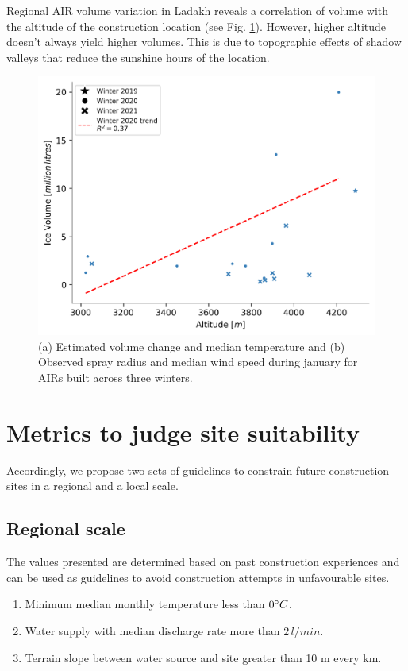 Regional AIR volume variation in Ladakh reveals a correlation of volume with the altitude of the construction
location (see Fig. \ref{fig:altvsvol}). However, higher altitude doesn't always yield higher volumes. This is
due to topographic effects of shadow valleys that reduce the sunshine hours of the location.

\begin{figure}[htb]
\centering
\includegraphics[width=12cm]{figs/altitudevsvolume.png}
\caption{(a) Estimated volume change and median temperature and (b) Observed spray radius and median wind speed
during january for AIRs built across three winters. }
\label{fig:altvsvol}
\end{figure}

\section{Metrics to judge site suitability}

Accordingly, we propose two sets of guidelines to constrain future construction sites in a regional and a local
scale. 

\subsection{Regional scale}

The values presented are determined based on past construction experiences and can be used as guidelines to
avoid construction attempts in unfavourable sites.

\begin{enumerate}

  \item Minimum median monthly temperature less than $0 ^{\circ} C$. 
  \item Water supply with median discharge rate more than $2\, l/min$.
  \item Terrain slope between water source and site greater than 10 m every km. 

\end{enumerate}


